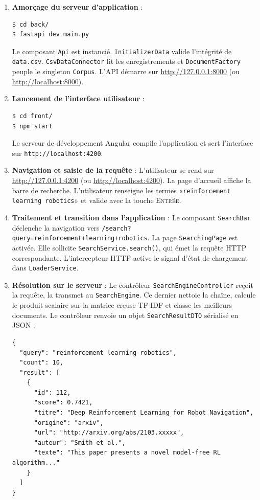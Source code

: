 \documentclass[12pt,a4paper]{article}
\begin{document}
\begin{enumerate}
    \item \textbf{Amorçage du serveur d'application} :
        \begin{verbatim}
$ cd back/
$ fastapi dev main.py
        \end{verbatim}
        Le composant \texttt{Api} est instancié. \texttt{InitializerData} valide l'intégrité de \texttt{data.csv}. \texttt{CsvDataConnector} lit les enregistrements et \texttt{DocumentFactory} peuple le singleton \texttt{Corpus}. L'API démarre sur \url{http://127.0.0.1:8000} (ou \url{http://localhost:8000}).

    \item \textbf{Lancement de l'interface utilisateur} :
        \begin{verbatim}
$ cd front/
$ npm start
        \end{verbatim}
        Le serveur de développement Angular compile l'application et sert l'interface sur \texttt{http://localhost:4200}.

    \item \textbf{Navigation et saisie de la requête} :
        L'utilisateur se rend sur \url{http://127.0.0.1:4200} (ou \url{http://localhost:4200}). La page d'accueil affiche la barre de recherche. L'utilisateur renseigne les termes «\texttt{reinforcement learning robotics}» et valide avec la touche \textsc{Entrée}.

    \item \textbf{Traitement et transition dans l'application} :
        Le composant \texttt{SearchBar} déclenche la navigation vers \texttt{/search?query=reinforcement+learning+robotics}. La page \texttt{SearchingPage} est activée. Elle sollicite \texttt{SearchService.search()}, qui émet la requête HTTP correspondante.
        L'intercepteur HTTP active le signal d'état de chargement dans \texttt{LoaderService}.

\newpage
    \item \textbf{Résolution sur le serveur} :
        Le contrôleur \texttt{SearchEngineController} reçoit la requête, la transmet au \texttt{SearchEngine}. Ce dernier nettoie la chaîne, calcule le produit scalaire sur la matrice creuse TF-IDF et classe les meilleurs documents. Le contrôleur renvoie un objet \texttt{SearchResultDTO} sérialisé en JSON :
        \begin{verbatim}
{
  "query": "reinforcement learning robotics",
  "count": 10,
  "result": [
    {
      "id": 112,
      "score": 0.7421,
      "titre": "Deep Reinforcement Learning for Robot Navigation",
      "origine": "arxiv",
      "url": "http://arxiv.org/abs/2103.xxxxx",
      "auteur": "Smith et al.",
      "texte": "This paper presents a novel model-free RL algorithm..."
    }
  ]
}
        \end{verbatim}


\end{enumerate}
\end{document}
